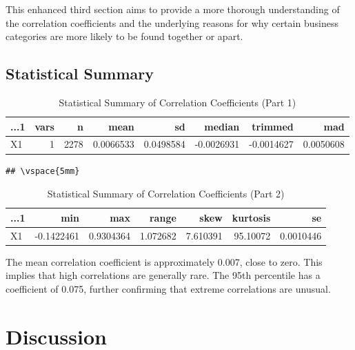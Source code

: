 \documentclass[
]{article}
\begin{document}
This enhanced third section aims to provide a more thorough understanding of the correlation coefficients and the underlying reasons for why certain business categories are more likely to be found together or apart.

\hypertarget{statistical-summary}{%
\subsection{Statistical Summary}\label{statistical-summary}}

\begin{table}

\caption{\label{tab:unnamed-chunk-2}Statistical Summary of Correlation Coefficients (Part 1)}
\centering
\begin{tabular}[t]{l|r|r|r|r|r|r|r}
\hline
...1 & vars & n & mean & sd & median & trimmed & mad\\
\hline
X1 & 1 & 2278 & 0.0066533 & 0.0498584 & -0.0026931 & -0.0014627 & 0.0050608\\
\hline
\end{tabular}
\end{table}

\begin{verbatim}
## \vspace{5mm}
\end{verbatim}

\begin{table}

\caption{\label{tab:unnamed-chunk-2}Statistical Summary of Correlation Coefficients (Part 2)}
\centering
\begin{tabular}[t]{l|r|r|r|r|r|r}
\hline
...1 & min & max & range & skew & kurtosis & se\\
\hline
X1 & -0.1422461 & 0.9304364 & 1.072682 & 7.610391 & 95.10072 & 0.0010446\\
\hline
\end{tabular}
\end{table}

The mean correlation coefficient is approximately 0.007, close to zero. This implies that high correlations are generally rare. The 95th percentile has a coefficient of 0.075, further confirming that extreme correlations are unusual.

\hypertarget{discussion}{%
\section{Discussion}\label{discussion}}
\end{document}
